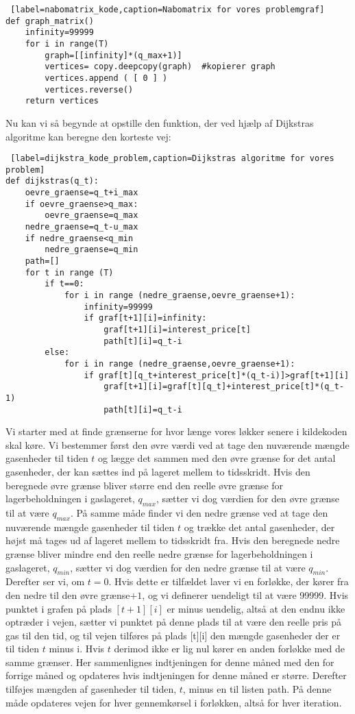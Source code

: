 \begin{lstlisting} [label=nabomatrix_kode,caption=Nabomatrix for vores problemgraf]
def graph_matrix()	
	infinity=99999
	for i in range(T)
		graph=[[infinity]*(q_max+1)]
		vertices= copy.deepcopy(graph)  #kopierer graph
		vertices.append ( [ 0 ] )
		vertices.reverse()
	return vertices
\end{lstlisting}

Nu kan vi så begynde at opstille den funktion, der ved hjælp af Dijkstras algoritme kan beregne den korteste vej:

\begin{lstlisting} [label=dijkstra_kode_problem,caption=Dijkstras algoritme for vores problem]
def dijkstras(q_t):
	oevre_graense=q_t+i_max
	if oevre_graense>q_max:
		oevre_graense=q_max
	nedre_graense=q_t-u_max
	if nedre_graense<q_min
		nedre_graense=q_min
	path=[]	
	for t in range (T)
		if t==0:
			for i in range (nedre_graense,oevre_graense+1):
				infinity=99999
				if graf[t+1][i]=infinity:
					graf[t+1][i]=interest_price[t]
					path[t][i]=q_t-i
		else:
			for i in range (nedre_graense,oevre_graense+1):
				if graf[t][q_t+interest_price[t]*(q_t-i)]>graf[t+1][i]
					graf[t+1][i]=graf[t][q_t]+interest_price[t]*(q_t-1)
					path[t][i]=q_t-i
\end{lstlisting}

Vi starter med at finde grænserne for hvor længe vores løkker senere i kildekoden skal køre. Vi bestemmer først den øvre værdi ved at tage den nuværende mængde gasenheder til tiden $t$ og lægge det sammen med den øvre grænse for det antal gasenheder, der kan sættes ind på lageret mellem to tidsskridt. Hvis den beregnede øvre grænse bliver større end den reelle øvre grænse for lagerbeholdningen i gaslageret, $q_{max}$, sætter vi dog værdien for den øvre grænse til at være $q_{max}$. På samme måde finder vi den nedre grænse ved at tage den nuværende mængde gasenheder til tiden $t$ og trække det antal gasenheder, der højst må tages ud af lageret mellem to tidsskridt fra. Hvis den beregnede nedre grænse bliver mindre end den reelle nedre grænse for lagerbeholdningen i gaslageret, $q_{min}$, sætter vi dog værdien for den nedre grænse til at være $q_{min}$. Derefter ser vi, om $t=0$. Hvis dette er tilfældet laver vi en forløkke, der kører fra den nedre til den øvre grænse$+1$, og vi definerer uendeligt til at være 99999. Hvis punktet i grafen på plads $[t+1][i]$ er minus uendelig, altså at den endnu ikke optræder i vejen, sætter vi punktet på denne plads til at være den reelle pris på gas til den tid, og til vejen tilføres på plads [t][i] den mængde gasenheder der er til tiden $t$ minus i. Hvis $t$ derimod ikke er lig nul kører en anden forløkke med de samme grænser. Her sammenlignes indtjeningen for denne måned med den for forrige måned og opdateres hvis indtjeningen for denne måned er større. Derefter tilføjes mængden af gasenheder til tiden, $t$, minus en til listen path. På denne måde opdateres vejen for hver gennemkørsel i forløkken, altså for hver iteration.